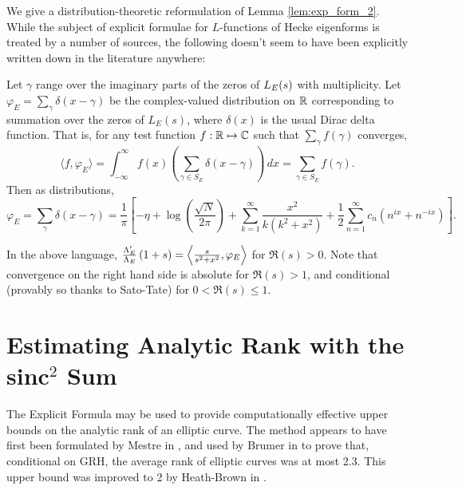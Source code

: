 We give a distribution-theoretic reformulation of Lemma \ref{lem:exp_form_2}. While the subject of explicit formulae for $L$-functions of Hecke eigenforms is treated by a number of sources, the following doesn't seem to have been explicitly written down in the literature anywhere:
\begin{proposition}[S.]
Let $\gamma$ range over the imaginary parts of the zeros of $L_E(s)$ with multiplicity. Let $\varphi_E = \sum_{\gamma} \delta(x-\gamma)$ be the complex-valued distribution on $\mathbb{R}$ corresponding to summation over the zeros of $L_E(s)$, where $\delta(x)$ is the usual Dirac delta function. That is, for any test function $f: \mathbb{R} \mapsto \mathbb{C}$ such that $\sum_{\gamma}f(\gamma)$ converges, 
\begin{equation}
\langle f,\varphi_E \rangle = \int_{-\infty}^{\infty} f(x)\left(\sum_{\gamma\in S_E} \delta(x-\gamma)\right) \, dx = \sum_{\gamma\in S_E} f(\gamma).
\end{equation}
Then as distributions,
\begin{equation}\label{eqn:exp_form_3}
\varphi_E = \sum_{\gamma} \delta(x-\gamma) = \frac{1}{\pi}\left[-\eta + \log\left(\frac{\sqrt{N}}{2\pi}\right) +\sum_{k=1}^{\infty} \frac{x^2}{k(k^2+x^2)} + \frac{1}{2}\sum_{n=1}^{\infty} c_n \left(n^{ix}+n^{-ix}\right) \right].
\end{equation}
\end{proposition}
In the above language, $\frac{\Lambda_E^{\prime}}{\Lambda_E}\left(1+s\right) = \left\langle \frac{s}{s^2+x^2},\varphi_E \right\rangle$ for $\Re(s) > 0$. Note that convergence on the right hand side is absolute for $\Re(s)>1$, and conditional (provably so thanks to Sato-Tate) for $0<\Re(s)\le 1$. \\

\newpage
\section{Estimating Analytic Rank with the sinc$^2$ Sum}

The Explicit Formula may be used to provide computationally effective upper bounds on the analytic rank of an elliptic curve. The method appears to have first been formulated by Mestre in \cite{Me-1986}, and used by Brumer in \cite{Bru-1992} to prove that, conditional on GRH, the average rank of elliptic curves was at most 2.3. This upper bound was improved to 2 by Heath-Brown in \cite{HeBr-2004}. \\

